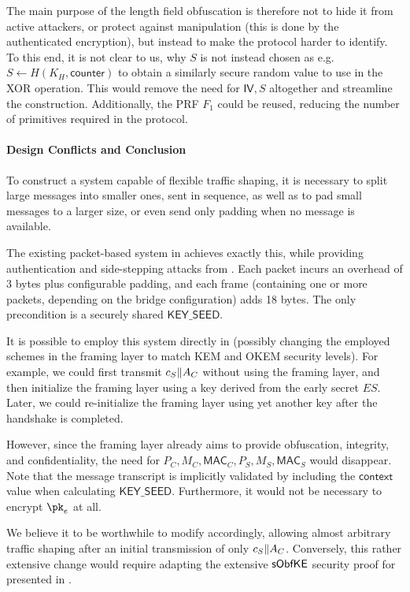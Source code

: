 The main purpose of the length field obfuscation is therefore not to hide it from active attackers, or protect against manipulation (this is done by the authenticated encryption), but instead to make the protocol harder to identify. To this end, it is not clear to us, why $S$ is not instead chosen as e.g. $S \gets H(K_H, \mathsf{counter})$ to obtain a similarly secure random value to use in the XOR operation. This would remove the need for $\mathsf{IV}, S$ altogether and streamline the construction. Additionally, the \drivel{} PRF $F_1$ could be reused, reducing the number of primitives required in the protocol.

\paragraph{Design Conflicts and Conclusion}

To construct a system capable of flexible traffic shaping, it is necessary to split large messages into smaller ones, sent in sequence, as well as to pad small messages to a larger size, or even send only padding when no message is available.

The existing packet-based system in \obfsfour{} achieves exactly this, while providing authentication and side-stepping attacks from \cite{SP:AlbPatWat09}. Each packet incurs an overhead of 3 bytes plus configurable padding, and each frame (containing one or more packets, depending on the bridge configuration) adds 18 bytes.
The only precondition is a securely shared $\mathsf{KEY\_SEED}$.

It is possible to employ this system directly in \drivel{} (possibly changing the employed schemes in the framing layer to match KEM and OKEM security levels).
For example, we could first transmit $c_S \| A_C$ without using the framing layer, and then initialize the framing layer using a key derived from the early secret $ES$. Later, we could re-initialize the framing layer using yet another key after the handshake is completed.

However, since the framing layer already aims to provide obfuscation, integrity, and confidentiality, the need for $P_C, M_C, \mathsf{MAC}_C, P_S, M_S, \mathsf{MAC}_S$ would disappear. Note that the message transcript is implicitly validated by including the $\mathsf{context}$ value when calculating $\mathsf{KEY\_SEED}$. Furthermore, it would not be necessary to encrypt $\pk_e$ at all.

We believe it to be worthwhile to modify \drivel{} accordingly, allowing almost arbitrary traffic shaping after an initial transmission of only $c_S \| A_C$.
Conversely, this rather extensive change would require adapting the extensive $\mathsf{sObfKE}$ security proof for \drivel{} presented in \cite{EPRINT:GRSV25}.

